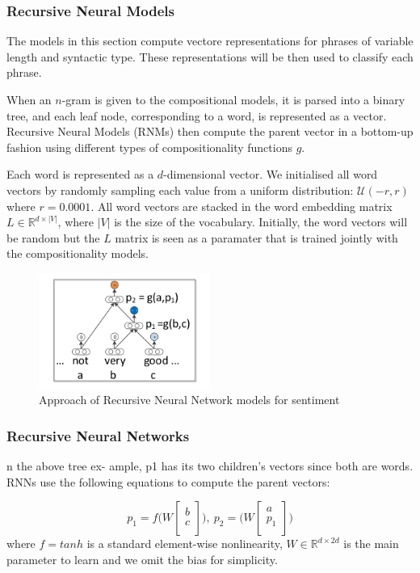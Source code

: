 \documentclass{llncs}
\begin{document}
\subsubsection{Recursive Neural Models}
The models in this section compute vectore representations for phrases of variable length and syntactic type. These representations will be then used to classify each phrase. 

When an $n$-gram is given to the compositional models, it is parsed into a binary tree, and each leaf node, corresponding to a word, is represented as a vector. Recursive Neural Models (RNMs) then compute the parent vector in a bottom-up fashion using different types of compositionality functions $g$.

Each word is represented as a $d$-dimensional vector. We initialised all word vectors by randomly sampling each value from a uniform distribution: $\mathcal{U} (-r, r)$ where $r = 0.0001$. All word vectors are stacked in the word embedding matrix $L \in \mathbb{R}^{d \times |V|}$, where $|V|$ is the size of the vocabulary. Initially, the word vectors will be random but the $L$ matrix is seen as a paramater that is trained jointly with the compositionality models.

\begin{figure}[H]
\centering
\caption{Approach of Recursive Neural Network models for sentiment}
\includegraphics[width=0.5\textwidth]{RNN.png}
\end{figure}

\subsubsection{Recursive Neural Networks}
n the above tree ex-
ample, p1 has its two children’s vectors since both
are words. RNNs use the following equations to
compute the parent vectors:

$$
p_1 = f \Bigg( W \begin{bmatrix}
       b \\[0.3em]
       c \\[0.3em]
     \end{bmatrix} \Bigg), \ p_2 =  \Bigg( W \begin{bmatrix}
       a \\[0.3em]
       p_1 \\[0.3em]
     \end{bmatrix} \Bigg)
$$
where $f = tanh$ is a standard element-wise nonlinearity, $W \in \mathbb{R}^{d \times 2d}$ is the main parameter to learn and we omit the bias for simplicity.
\end{document}
